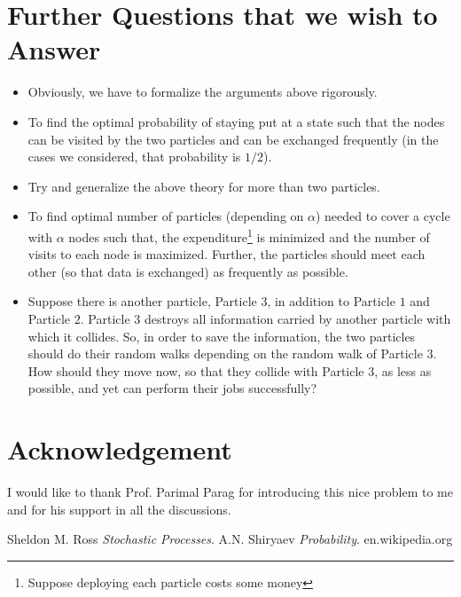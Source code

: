 \documentclass[11pt]{article}
\begin{document}
	\section{Further Questions that we wish to Answer}
	\begin{itemize}
		\item Obviously, we have to formalize the arguments above rigorously.
		\item To find the optimal probability of staying put at a state such that the nodes can be visited by the two particles and can be exchanged frequently (in the cases we considered, that probability  is $1/2$).
		\item Try and generalize the above theory for more than two particles.
		\item To find optimal number of particles (depending on $\alpha$) needed to cover a cycle with $\alpha$ nodes such that, the expenditure\footnote{Suppose deploying each particle costs some money} is minimized and the number of visits to each node is maximized. Further, the particles should meet each other (so that data is exchanged) as frequently as possible. 
		\item Suppose there is another particle, Particle $3$, in addition to Particle $1$ and Particle $2$. Particle $3$ destroys all information carried by another particle with which it collides. So, in order to save the information, the two particles should do their random walks depending on the random walk of Particle $3$. How should they move now, so that they collide with Particle $3$, as less as possible, and yet can perform their jobs successfully?
	\end{itemize}
	
\section*{Acknowledgement}	
I would like to thank Prof. Parimal Parag for introducing this nice problem to me and for his support in all the discussions. 

\begin{thebibliography}{9}
	Sheldon M. Ross
	\textit{Stochastic Processes}.
	A.N. Shiryaev
	\textit{Probability}.
	en.wikipedia.org	
\end{thebibliography}
	
\end{document}
